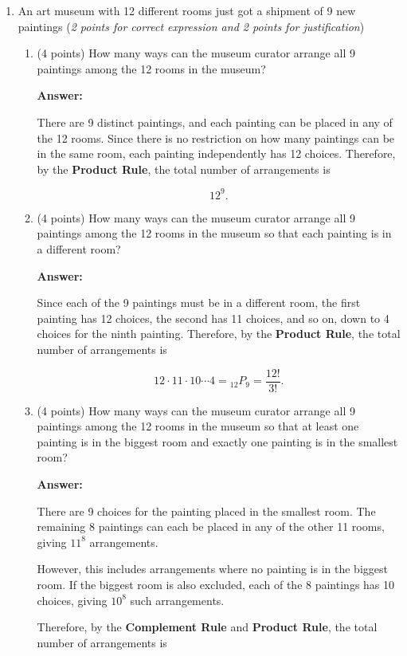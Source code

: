 \documentclass[10pt,letterpaper,unboxed,cm]{article}
\begin{document}
\begin{enumerate}
\begin{enumerate}
\[
\boxed{\binom{26}{7}}.
\]

\end{enumerate}

\item
An art museum with 12 different rooms just got a shipment of 9 new paintings (\emph{2 points for correct expression and 2 points for justification})
\begin{enumerate}
\item
(4 points)
How many ways can the museum curator arrange all 9 paintings among the 12 rooms in the museum?

\textbf{Answer:}


There are 9 distinct paintings, and each painting can be placed in any
of the 12 rooms. Since there is no restriction on how many paintings
can be in the same room, each painting independently has 12 choices.
Therefore, by the \textbf{Product Rule}, the total number of
arrangements is

\[
\boxed{12^9}.
\]

\item
(4 points)
How many ways can the museum curator arrange all 9 paintings among the 12 rooms in the museum so that each painting is in a different room?

\textbf{Answer:}

Since each of the 9 paintings must be in a different room, the first
painting has 12 choices, the second has 11 choices, and so on, down to
4 choices for the ninth painting.
Therefore, by the \textbf{Product Rule}, the total number of
arrangements is

\[
\boxed{12\cdot11\cdot10\cdots4
= {}_{12}P_9
= \frac{12!}{3!}}.
\]

\item
(4 points)
How many ways can the museum curator arrange all 9 paintings among the 12 rooms in the museum so that at least one painting is in the biggest room and exactly one painting is in the smallest room?

\textbf{Answer:}


There are 9 choices for the painting placed in the smallest room.
The remaining 8 paintings can each be placed in any of the other
11 rooms, giving $11^8$ arrangements.

However, this includes arrangements where no painting is in the biggest
room. If the biggest room is also excluded, each of the 8 paintings has
10 choices, giving $10^8$ such arrangements.

Therefore, by the \textbf{Complement Rule} and \textbf{Product Rule},
the total number of arrangements is


\end{enumerate}
\end{enumerate}
\end{document}
